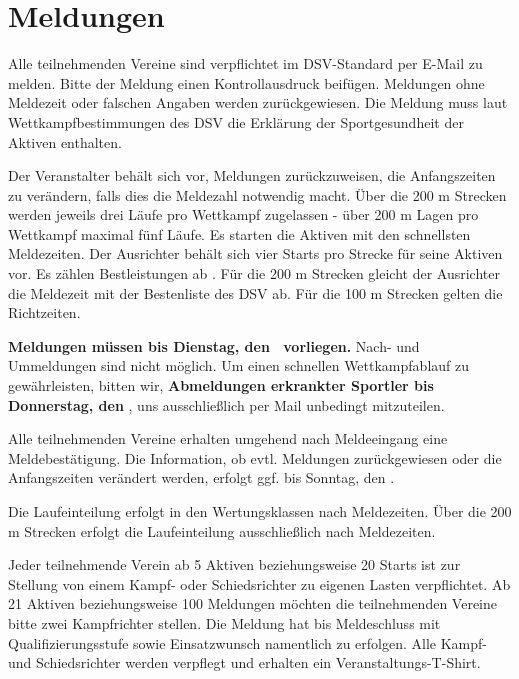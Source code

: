 \section{Meldungen}

Alle teilnehmenden Vereine sind verpflichtet im DSV-Standard per E-Mail zu melden. Bitte der Meldung einen Kontrollausdruck beifügen. Meldungen ohne Meldezeit oder falschen Angaben werden zurückgewiesen. Die Meldung muss laut Wettkampfbestimmungen des DSV die Erklärung der Sportgesundheit der Aktiven enthalten.

Der Veranstalter behält sich vor, Meldungen zurückzuweisen, die Anfangszeiten zu verändern, falls dies die Meldezahl notwendig macht. Über die 200 m Strecken werden jeweils drei Läufe pro Wettkampf zugelassen - über 200 m Lagen pro Wettkampf maximal fünf Läufe. Es starten die Aktiven mit den schnellsten Meldezeiten. Der Ausrichter behält sich vier Starts pro Strecke für seine Aktiven vor. Es zählen Bestleistungen ab \athleteBestDate. Für die 200 m Strecken gleicht der Ausrichter die Meldezeit mit der Bestenliste des DSV ab. Für die 100 m Strecken gelten die Richtzeiten.

\newpage

\textbf{Meldungen müssen bis Dienstag, den \registrationDeadline\ vorliegen.} Nach- und Ummeldungen sind nicht möglich. Um einen schnellen Wettkampfablauf zu gewährleisten, bitten wir, \textbf{Abmeldungen erkrankter Sportler bis Donnerstag, den \deregistrationDeadline}, uns ausschließlich per Mail unbedingt mitzuteilen.

Alle teilnehmenden Vereine erhalten umgehend nach Meldeeingang eine Meldebestätigung. Die Information, ob evtl. Meldungen zurückgewiesen oder die Anfangszeiten verändert werden, erfolgt ggf. bis Sonntag, den \entryConfirmationDate. 

Die Laufeinteilung erfolgt in den Wertungsklassen nach Meldezeiten. Über die 200 m Strecken erfolgt die Laufeinteilung ausschließlich nach Meldezeiten.

Jeder teilnehmende Verein ab 5 Aktiven beziehungsweise 20 Starts ist zur Stellung von einem Kampf- oder Schiedsrichter zu eigenen Lasten verpflichtet. Ab 21 Aktiven beziehungsweise 100 Meldungen möchten die teilnehmenden Vereine bitte zwei Kampfrichter stellen. Die Meldung hat bis Meldeschluss mit Qualifizierungsstufe sowie Einsatzwunsch namentlich zu erfolgen. Alle Kampf- und Schiedsrichter werden verpflegt und erhalten ein Veranstaltungs-T-Shirt.

